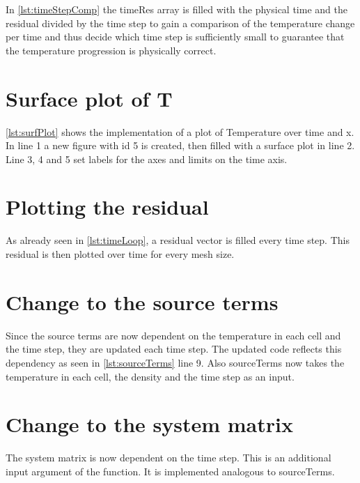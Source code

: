 

In \autoref{lst:timeStepComp} the timeRes array is filled with the physical time and the residual divided by the time step to gain a comparison of the temperature change per time and thus decide which time step is sufficiently small to guarantee that the temperature progression is physically correct.

%
\section{Surface plot of T}


\autoref{lst:surfPlot} shows the implementation of a plot of Temperature over time and x. In line 1 a new figure with id 5 is created, then filled with a surface plot in line 2. Line 3, 4  and 5 set labels for the axes and limits on the time axis.

\section{Plotting the residual}
As already seen in \autoref{lst:timeLoop}, a residual vector is filled every time step. This residual is then plotted over time for every mesh size.


\section{Change to the source terms}
Since the source terms are now dependent on the temperature in each cell and the time step, they are updated each time step. The updated code reflects this dependency as seen in \autoref{lst:sourceTerms} line 9. Also sourceTerms now takes the temperature in each cell, the density and the time step as an input.




\section{Change to the system matrix}
The system matrix is now dependent on the time step. This is an additional input argument of the function. It is implemented analogous to sourceTerms.




